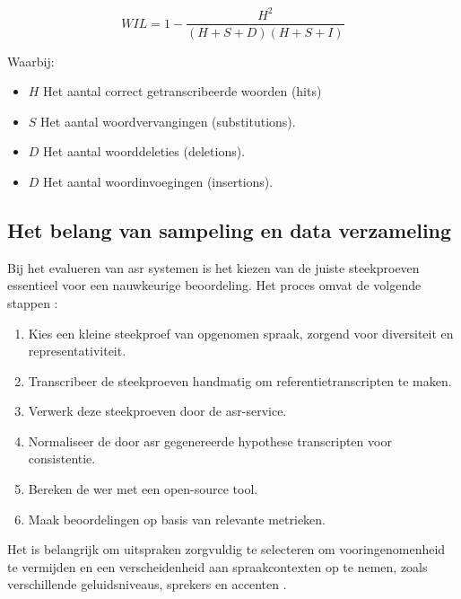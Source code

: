 \begin{equation}
    WIL = 1 - \frac{H^2}{(H + S + D)(H + S + I)}
\end{equation}


Waarbij:

\begin{itemize}
    \item $H$ Het aantal correct getranscribeerde woorden (hits)
    \item $S$ Het aantal woordvervangingen (substitutions).
    \item $D$ Het aantal woorddeleties (deletions).
    \item $D$ Het aantal woordinvoegingen (insertions).
\end{itemize}
\subsection{Het belang van sampeling en data verzameling}
Bij het evalueren van \gls{asr} systemen is het kiezen van de juiste steekproeven essentieel voor een nauwkeurige beoordeling. Het proces omvat de volgende stappen \autocite{awsmlblog2023}:

\begin{enumerate}
    \item Kies een kleine steekproef van opgenomen spraak, zorgend voor diversiteit en representativiteit.
    \item Transcribeer de steekproeven handmatig om referentietranscripten te maken.
    \item Verwerk deze steekproeven door de \gls{asr}-service.
    \item Normaliseer de door \gls{asr} gegenereerde hypothese transcripten voor consistentie.
    \item Bereken de \gls{wer} met een open-source tool.
    \item Maak beoordelingen op basis van relevante metrieken.
\end{enumerate}

Het is belangrijk om uitspraken zorgvuldig te selecteren om vooringenomenheid te vermijden en een verscheidenheid aan spraakcontexten op te nemen, zoals verschillende geluidsniveaus, sprekers en accenten \autocite{awsmlblog2023}.


